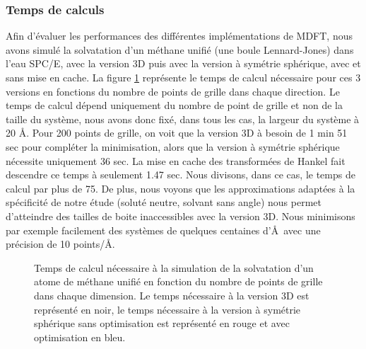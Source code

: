 \subsubsection{Temps de calculs}
Afin d'évaluer les performances des différentes implémentations de MDFT, nous avons simulé la solvatation d'un méthane unifié (une boule Lennard-Jones) dans l'eau SPC/E, avec la version 3D puis avec la version à symétrie sphérique, avec et sans mise en cache.
La figure \ref{fig:temps_calcul_methane_versions} représente le temps de calcul nécessaire pour ces 3 versions en fonctions du nombre de points de grille dans chaque direction.
Le temps de calcul dépend uniquement du nombre de point de grille et non de la taille du système, nous avons donc fixé, dans tous les cas, la largeur du système à 20 \AA.
Pour 200 points de grille, on voit que la version 3D à besoin de 1 min 51 sec pour compléter la minimisation, alors que la version à symétrie sphérique nécessite uniquement 36 sec.
La mise en cache des transformées de Hankel fait descendre ce temps à seulement 1.47 sec.
Nous divisons, dans ce cas, le temps de calcul par plus de 75.
De plus, nous voyons que les approximations adaptées à la spécificité de notre étude (soluté neutre, solvant sans angle) nous permet d'atteindre des tailles de boite inaccessibles avec la version 3D.
Nous minimisons par exemple facilement des systèmes de quelques centaines d'\AA\ avec une précision de 10 points/\AA.



\begin{figure}[H]
  \centering
  \caption[Temps de calcul nécessaire à la simulation de la solvatation d'un atome de méthane unifié.]{Temps de calcul nécessaire à la simulation de la solvatation d'un atome de méthane unifié en fonction du nombre de points de grille dans chaque dimension. Le temps nécessaire à la version 3D est représenté en noir, le temps nécessaire à la version à symétrie sphérique sans optimisation est représenté en rouge et avec optimisation en bleu.}
  \label{fig:temps_calcul_methane_versions}
\end{figure}

